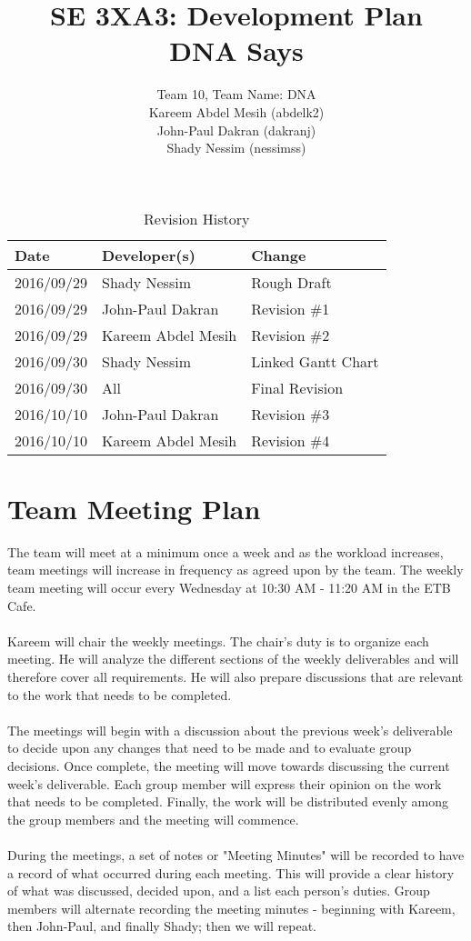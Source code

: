 \documentclass{article}
\title{SE 3XA3: Development Plan\\DNA Says}
\author{Team 10, Team Name: DNA
		\\ Kareem Abdel Mesih (abdelk2)
		\\ John-Paul Dakran (dakranj)
		\\ Shady Nessim (nessimss)
}
\date{}
\begin{document}
\begin{table}[hp]
\caption{Revision History} \label{TblRevisionHistory}
\begin{tabularx}{\textwidth}{llX}
\toprule
\textbf{Date} & \textbf{Developer(s)} & \textbf{Change}\\
\midrule
2016/09/29 & Shady Nessim & Rough Draft\\
2016/09/29 & John-Paul Dakran &  Revision \#1\\
2016/09/29 & Kareem Abdel Mesih &  Revision \#2\\
2016/09/30 & Shady Nessim & Linked Gantt Chart\\
2016/09/30 & All & Final Revision\\
2016/10/10 & John-Paul Dakran & Revision \#3\\
2016/10/10 & Kareem Abdel Mesih & Revision \#4\\
\bottomrule
\end{tabularx}
\end{table}
\newpage
\maketitle
\newpage
\section{Team Meeting Plan} 
The team will meet at a minimum once a week and as the workload increases, team meetings will increase in frequency as agreed upon by the team. The weekly team meeting will occur every Wednesday at 10:30 AM - 11:20 AM in the ETB Cafe.\\
\\
Kareem will chair the weekly meetings. The chair's duty is to organize each meeting. He will analyze the different sections of the weekly deliverables and will therefore cover all requirements. He will also prepare discussions that are relevant to the work that needs to be completed.\\
\\
The meetings will begin with a discussion about the previous week's deliverable to decide upon any changes that need to be made and to evaluate group decisions. Once complete, the meeting will move towards discussing the current week's deliverable. Each group member will express their opinion on the work that needs to be completed. Finally, the work will be distributed evenly among the group members and the meeting will commence.\\
\\
During the  meetings, a set of notes or "Meeting Minutes" will be recorded to have a record of what occurred during each meeting. This will provide a clear history of what was discussed, decided upon, and a list each person's duties. Group members will alternate recording the meeting minutes - beginning with Kareem, then John-Paul, and finally Shady; then we will repeat.
\end{document}
